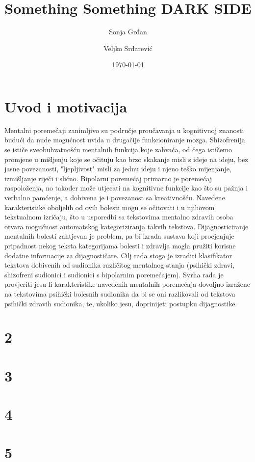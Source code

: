 \documentclass[a4paper]{article}
\title{Something Something DARK SIDE}
\date{\today}
\author{Sonja Grđan \and Veljko Srdarević}
\begin{document}
\maketitle
\tableofcontest
\section{Uvod i motivacija}
Mentalni poremećaji zanimljivo su područje proučavanja u kognitivnoj znanosti budući da nude mogućnost uvida u drugačije funkcioniranje mozga. 
Shizofrenija se ističe sveobuhvatnošću mentalnih funkcija koje zahvaća, od čega ističemo promjene u mišljenju koje se očituju kao brzo skakanje misli s ideje na ideju, 
bez jasne povezanosti, "ljepljivost" misli za jednu ideju i njeno teško mijenjanje, izmišljanje riječi i slično. 
Bipolarni poremećaj primarno je poremećaj raspoloženja, no također može utjecati na kognitivne funkcije kao što su pažnja i verbalno pamćenje, 
a dobivena je i povezanost sa kreativnošću. Navedene karakteristike oboljelih od ovih bolesti mogu se očitovati i u njihovom tekstualnom izričaju, 
što u usporedbi sa tekstovima mentalno zdravih osoba otvara mogućnost automatskog kategoriziranja takvih tekstova. 
Dijagnosticiranje mentalnih bolesti zahtjevan je problem, 
pa bi izrada sustava koji procjenjuje pripadnost nekog teksta kategorijama bolesti i zdravlja mogla pružiti korisne dodatne informacije za dijagnostičare. 
Cilj rada stoga je izraditi klasifikator tekstova dobivenih od sudionika različitog mentalnog stanja (psihički zdravi, shizofreni sudionici i sudionici s bipolarnim poremećajem). 
Svrha rada je provjeriti jesu li karakteristike navedenih mentalnih poremećaja dovoljno izražene na tekstovima psihički bolesnih sudionika da bi se oni razlikovali od tekstova 
psihički zdravih sudionika, te, ukoliko jesu, doprinijeti postupku dijagnostike.
\section{2}
\section{3}
\section{4}
\section{5}
\end{document}
